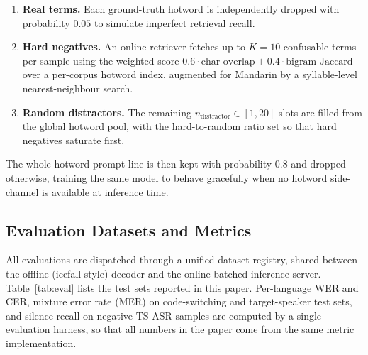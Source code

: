 \begin{enumerate}
  \item \textbf{Real terms.} Each ground-truth hotword is
        independently dropped with probability $0.05$ to simulate
        imperfect retrieval recall.
  \item \textbf{Hard negatives.} An online retriever fetches up to
        $K\!=\!10$ confusable terms per sample using the weighted
        score $0.6\cdot\text{char-overlap} +
        0.4\cdot\text{bigram-Jaccard}$ over a per-corpus hotword
        index, augmented for Mandarin by a syllable-level
        nearest-neighbour search.
  \item \textbf{Random distractors.} The remaining
        $n_\text{distractor}\!\in\![1, 20]$ slots are filled from the
        global hotword pool, with the hard-to-random ratio set so
        that hard negatives saturate first.
\end{enumerate}

The whole hotword prompt line is then kept with probability $0.8$
and dropped otherwise, training the same model to behave gracefully
when no hotword side-channel is available at inference time.

\subsection{Evaluation Datasets and Metrics}
\label{subsec:eval-data}

All evaluations are dispatched through a unified dataset registry,
shared between the offline (icefall-style) decoder and the online
batched inference server. Table~\ref{tab:eval} lists the test sets
reported in this paper. Per-language WER and CER, mixture error
rate (MER) on code-switching and target-speaker test sets, and
silence recall on negative TS-ASR samples are computed by a single
evaluation harness, so that all numbers in the paper come from the
same metric implementation.

